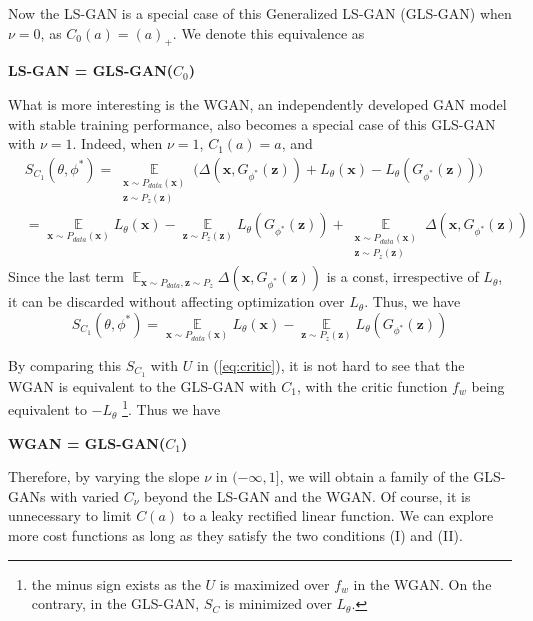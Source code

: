 \documentclass[11pt,fullpage, letterpaper,twoside]{article}
\newcommand{\1}[1]{\mathds{1}_{\left[#1\right]}}
\begin{document}
Now the LS-GAN is a special case of this Generalized LS-GAN (GLS-GAN) when $\nu=0$, as $C_0(a)=(a)_+$. We denote this equivalence as

\vspace{1mm}
\centerline{\bf LS-GAN = GLS-GAN($C_0$)}
\vspace{1mm}

What is more interesting is the WGAN, an independently developed GAN model with stable training performance, also becomes a special case of this GLS-GAN with $\nu=1$.  Indeed, when $\nu=1$, $C_1(a)=a$, and
\[
\begin{aligned}
&S_{C_1}(\theta,\phi^*)
= \mathop \mathbb E\limits_{\substack{\mathbf x\sim P_{data}(\mathbf x) \\ \mathbf z\sim P_{z}(\mathbf z)}}\big( \Delta(\mathbf x, G_{\phi^*}(\mathbf z)) + L_\theta(\mathbf x) - L_\theta(G_{\phi^*}(\mathbf z))\big)\\
&=  \mathop \mathbb E\limits_{\mathbf x\sim P_{data}(\mathbf x)} L_\theta(\mathbf x) - \mathop \mathbb E\limits_{\mathbf z\sim P_{z}(\mathbf z)} L_\theta(G_{\phi^*}(\mathbf z))
+\mathop \mathbb E\limits_{\substack{\mathbf x\sim P_{data}(\mathbf x) \\ \mathbf z\sim P_{z}(\mathbf z)}}\Delta(\mathbf x, G_{\phi^*}(\mathbf z))
\end{aligned}
\]
Since the last term $\mathop \mathbb E_{{\mathbf x\sim P_{data}, \mathbf z\sim P_{z}}}\Delta(\mathbf x, G_{\phi^*}(\mathbf z))$ is a const, irrespective of $L_\theta$, it can be discarded without affecting optimization over $L_\theta$. Thus, we have
$$
S_{C_1}(\theta,\phi^*)=\mathop \mathbb E\limits_{\mathbf x\sim P_{data}(\mathbf x)} L_\theta(\mathbf x) - \mathop \mathbb E\limits_{\mathbf z\sim P_{z}(\mathbf z)} L_\theta(G_{\phi^*}(\mathbf z))
$$

By comparing this $S_{C_1}$ with $U$ in (\ref{eq:critic}), it is not hard to see that the WGAN is equivalent to the GLS-GAN with $C_1$, with the critic function $f_w$ being equivalent to $-L_\theta$ \footnote{the minus sign exists as the $U$ is maximized over $f_w$ in the WGAN. On the contrary, in the GLS-GAN, $S_C$ is minimized over $L_\theta$.}. Thus we have

\vspace{1mm}\centerline{\bf WGAN = GLS-GAN($C_1$)}\vspace{1mm}

Therefore, by varying the slope $\nu$ in $(-\infty,1]$, we will obtain a family of the GLS-GANs with varied $C_\nu$ beyond the LS-GAN and the WGAN.
Of course, it is unnecessary to limit $C(a)$ to a leaky rectified linear function. We can explore more cost functions as long as they satisfy the two conditions (I) and (II).
\end{document}
